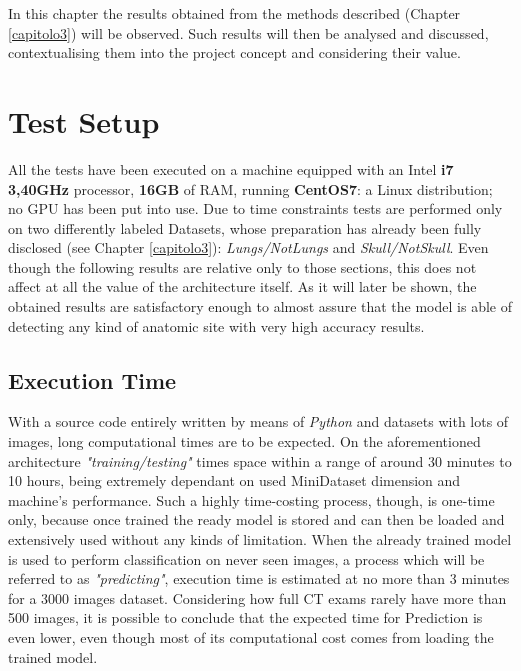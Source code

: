 \documentclass[../main.tex]{subfiles}
\begin{document}
\label{capitolo4}
\thispagestyle{empty}

In this chapter the results obtained from the methods described (Chapter \ref{capitolo3}) will be observed. Such results will then be analysed and discussed, contextualising them into the project concept and considering their value.

\section{Test Setup}
All the tests have been executed on a machine equipped with an Intel \textbf{i7 3,40GHz} processor, \textbf{16GB} of RAM, running \textbf{CentOS7}: a Linux distribution; no GPU has been put into use.
Due to time constraints tests are performed only on two differently labeled Datasets, whose preparation has already been fully disclosed (see Chapter \ref{capitolo3}): \textit{Lungs/NotLungs} and \textit{Skull/NotSkull}. Even though the following results are relative only to those sections, this does not affect at all the value of the architecture itself. As it will later be shown, the obtained results are satisfactory enough to almost assure that the model is able of detecting any kind of anatomic site with very high accuracy results.\\
\vspace{5mm}
\subsection{Execution Time}
With a source code entirely written by means of \textit{Python} and datasets with lots of images, long computational times are to be expected. On the aforementioned architecture \textit{"training/testing"} times space within a range of around 30 minutes to 10 hours, being extremely dependant on used MiniDataset dimension and machine's performance. Such a highly time-costing process, though, is one-time only, because once trained the ready model is stored and can then be loaded and extensively used without any kinds of limitation. When the already trained model is used to perform classification on never seen images, a process which will be referred to as \textit{"predicting"}, execution time is estimated at no more than 3 minutes for a 3000 images dataset. Considering how full CT exams rarely have more than 500 images, it is possible to conclude that the expected time for Prediction is even lower, even though most of its computational cost comes from loading the trained model.
\end{document}
